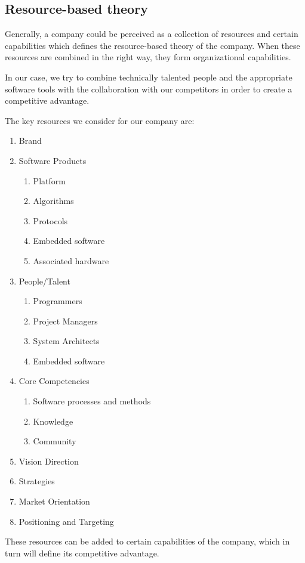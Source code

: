 \subsection{Resource-based theory}

Generally, a company could be perceived as a collection of resources and certain capabilities which defines the resource-based theory of the company.
When these resources are combined in the right way, they form organizational capabilities.

In our case, we try to combine technically talented people and the appropriate software tools with the collaboration with our competitors in order to create a competitive advantage.

The key resources we consider for our company are:

\begin{enumerate}
  \item Brand
  \item Software Products
  	\begin{enumerate}
   		\item Platform
   		\item Algorithms  	
    	\item Protocols
    	\item Embedded software
    	\item Associated hardware
  	\end{enumerate}
  \item People/Talent
  	\begin{enumerate}
      	\item Programmers
      	\item Project Managers
      	\item System Architects
      	\item Embedded software
    \end{enumerate}
  \item Core Competencies
  	\begin{enumerate}
        	\item Software processes and methods
        	\item Knowledge
        	\item Community
    \end{enumerate}
  \item Vision Direction
  \item Strategies
  \item Market Orientation
  \item Positioning and Targeting
\end{enumerate}


These resources can be added to certain capabilities of the company, which in turn will define its competitive advantage.